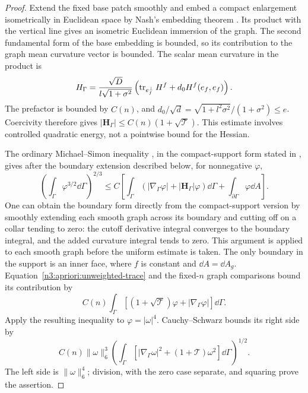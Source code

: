 \begin{proof}
Extend the fixed base patch smoothly and embed a compact enlargement
isometrically in Euclidean space by Nash's embedding theorem
\cite[Theorem~2]{Nash1956}.  Its product with the vertical
line gives an isometric Euclidean immersion of the graph.  The
second fundamental form of the base embedding is bounded, so its
contribution to the graph mean curvature vector is bounded.
The scalar mean curvature in the product is
\[
 H_\Gamma=
 \frac{\sqrt D}{l\sqrt{1+\sigma^2}}
       \left(\operatorname{tr}_{e_f^\perp}H^f+d_0H^f(e_f,e_f)\right).
\]
The prefactor is bounded by $C(n)$, and
$d_0/\sqrt d=\sqrt{1+l^2\sigma^2}/(1+\sigma^2)\le e$.
Coercivity therefore gives
$|\boldsymbol H_\Gamma|\le C(n)(1+\sqrt{\mathcal T})$.
This estimate involves controlled quadratic energy, not a pointwise
bound for the Hessian.

The ordinary Michael--Simon inequality \cite{MichaelSimon1973}, in
the compact-support form stated in
\cite[Chapter~4, Section~5, Theorem~5.7]{Simon2014}, gives after the
boundary extension described below, for nonnegative $\varphi$,
\[
 \left(\int_\Gamma\varphi^{3/2}\dd\Gamma\right)^{2/3}
 \le C\left[
       \int_\Gamma(|\nabla_\Gamma\varphi|
                          +|\boldsymbol H_\Gamma|\varphi)\dd\Gamma
       +\int_{\partial\Gamma}\varphi\dd A\right].
\]
One can obtain the boundary form directly from the compact-support
version by smoothly extending each smooth graph across its boundary
and cutting off on a collar tending to zero: the cutoff derivative
integral converges to the boundary integral, and the added curvature
integral tends to zero.  This argument is applied to each smooth
graph before the uniform estimate is taken.  The only boundary in
the support is an inner face, where $f$ is constant and
$\dd A=\dd A_g$.  Equation~\eqref{n3:apriori:unweighted-trace} and
the fixed-$n$ graph comparisons bound its contribution by
\[
 C(n)\int_\Gamma
       [(1+\sqrt{\mathcal T})\varphi
                               +|\nabla_\Gamma\varphi|]\dd\Gamma.
\]
Apply the resulting inequality to $\varphi=|\omega|^4$.
Cauchy--Schwarz bounds its right side by
\[
 C(n)\|\omega\|_6^3
 \left(\int_\Gamma
       [|\nabla_\Gamma\omega|^2+(1+\mathcal T)\omega^2]
                                      \dd\Gamma\right)^{1/2}.
\]
The left side is $\|\omega\|_6^4$; division, with the zero case
separate, and squaring prove the assertion.
\end{proof}


